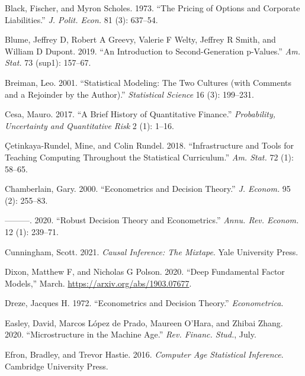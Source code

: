 \documentclass{article}
\newlength{\cslhangindent}
\newlength{\cslentryspacingunit} %
\newenvironment{CSLReferences}[2] %
 {%
  \setlength{\parindent}{0pt}
  \ifodd #1
  \let\oldpar\par
  \def\par{\hangindent=\cslhangindent\oldpar}
  \fi
  \setlength{\parskip}{#2\cslentryspacingunit}
 }%
 {}
\begin{document}
\begin{CSLReferences}{1}{0}
\leavevmode{}%
Black, Fischer, and Myron Scholes. 1973. {``The Pricing of Options and
Corporate Liabilities.''} \emph{J. Polit. Econ.} 81 (3): 637--54.

\leavevmode{}%
Blume, Jeffrey D, Robert A Greevy, Valerie F Welty, Jeffrey R Smith, and
William D Dupont. 2019. {``An Introduction to Second-Generation
p-Values.''} \emph{Am. Stat.} 73 (sup1): 157--67.

\leavevmode{}%
Breiman, Leo. 2001. {``Statistical Modeling: The Two Cultures (with
Comments and a Rejoinder by the Author).''} \emph{Statistical Science}
16 (3): 199--231.

\leavevmode{}%
Cesa, Mauro. 2017. {``A Brief History of Quantitative Finance.''}
\emph{Probability, Uncertainty and Quantitative Risk} 2 (1): 1--16.

\leavevmode{}%
Çetinkaya-Rundel, Mine, and Colin Rundel. 2018. {``Infrastructure and
Tools for Teaching Computing Throughout the Statistical Curriculum.''}
\emph{Am. Stat.} 72 (1): 58--65.

\leavevmode{}%
Chamberlain, Gary. 2000. {``Econometrics and Decision Theory.''}
\emph{J. Econom.} 95 (2): 255--83.

\leavevmode{}%
---------. 2020. {``Robust Decision Theory and Econometrics.''}
\emph{Annu. Rev. Econom.} 12 (1): 239--71.

\leavevmode{}%
Cunningham, Scott. 2021. \emph{Causal Inference: The Mixtape}. Yale
University Press.

\leavevmode{}%
Dixon, Matthew F, and Nicholas G Polson. 2020. {``Deep Fundamental
Factor Models,''} March. \url{https://arxiv.org/abs/1903.07677}.

\leavevmode{}%
Dreze, Jacques H. 1972. {``Econometrics and Decision Theory.''}
\emph{Econometrica}.

\leavevmode{}%
Easley, David, Marcos López de Prado, Maureen O'Hara, and Zhibai Zhang.
2020. {``Microstructure in the Machine Age.''} \emph{Rev. Financ.
Stud.}, July.

\leavevmode{}%
Efron, Bradley, and Trevor Hastie. 2016. \emph{Computer Age Statistical
Inference}. Cambridge University Press.


\end{CSLReferences}
\end{document}
